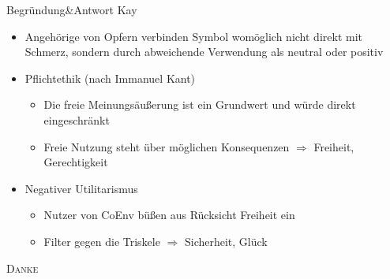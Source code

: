\documentclass{cubeamer}
\begin{document}
\begin{frame}{Begründung\&Antwort Kay}
    \begin{itemize}
        \item Angehörige von Opfern verbinden Symbol womöglich nicht direkt mit Schmerz, sondern durch abweichende Verwendung als neutral oder positiv
        \item Pflichtethik (nach Immanuel Kant)
        \begin{itemize}
            \item Die freie Meinungsäußerung ist ein Grundwert und würde direkt eingeschränkt
            \item Freie Nutzung steht über möglichen Konsequenzen \(\Rightarrow\) Freiheit, Gerechtigkeit
        \end{itemize}
        \item Negativer Utilitarismus
        \begin{itemize}
            \item Nutzer von CoEnv büßen aus Rücksicht Freiheit ein 
            \item Filter gegen die Triskele \(\Rightarrow\) Sicherheit, Glück
        \end{itemize}
    \end{itemize}
\end{frame}


\begin{frame}[standout]
    \Huge\textsc{Danke\!}
\end{frame}
\end{document}
